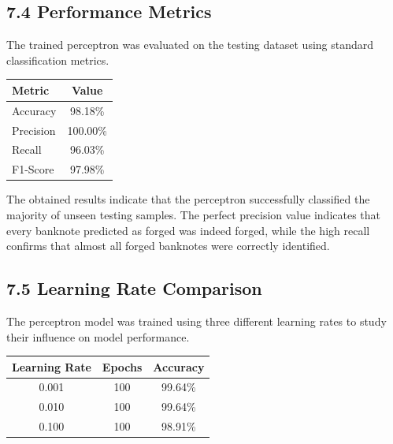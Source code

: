 \documentclass[11pt,a4paper]{article}
\begin{document}


\subsection*{7.4 Performance Metrics}

The trained perceptron was evaluated on the testing dataset using standard classification metrics.

\vspace{0.3cm}

\begin{center}
\begin{tabular}{|p{6cm}|c|}
\hline
\textbf{Metric} & \textbf{Value}\\
\hline
Accuracy & 98.18\%\\
\hline
Precision & 100.00\%\\
\hline
Recall & 96.03\%\\
\hline
F1-Score & 97.98\%\\
\hline
\end{tabular}
\end{center}

The obtained results indicate that the perceptron successfully classified the majority of unseen testing samples. The perfect precision value indicates that every banknote predicted as forged was indeed forged, while the high recall confirms that almost all forged banknotes were correctly identified.



\subsection*{7.5 Learning Rate Comparison}

The perceptron model was trained using three different learning rates to study their influence on model performance.

\begin{center}
\begin{tabular}{|c|c|c|}
\hline
\textbf{Learning Rate} & \textbf{Epochs} & \textbf{Accuracy}\\
\hline
0.001 & 100 & 99.64\%\\
\hline
0.010 & 100 & 99.64\%\\
\hline
0.100 & 100 & 98.91\%\\
\hline
\end{tabular}
\end{center}
\end{document}
